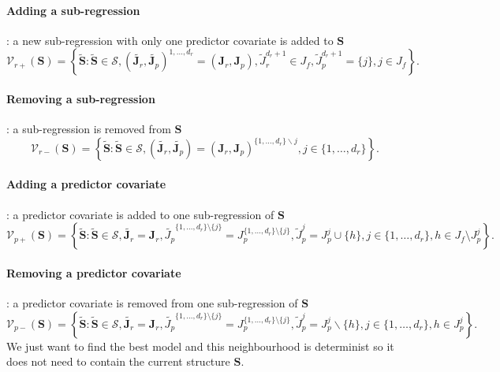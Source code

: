 \documentclass[12pt,a4paper]{report}
\begin{document}
	\paragraph{Adding a sub-regression}: a new sub-regression with only one predictor covariate is added to $\boldsymbol{S}$
\begin{equation}
\mathcal{V}_{r+}(\boldsymbol{S}) = \left\{\tilde{\boldsymbol{S}}: \tilde{\boldsymbol{S}}\in\mathcal{S}, (\tilde{\boldsymbol{J}_r},\tilde{\boldsymbol{J}_p})^{1,\ldots,d_r}=(\boldsymbol{J}_r,\boldsymbol{J}_p), \tilde{J}_r^{d_r+1}\in J_f, \tilde{J}_p^{d_r+1}=\{j\}, j\in J_f \right\}.
\end{equation}	
		\paragraph{Removing a sub-regression}: a sub-regression  is removed from $\boldsymbol{S}$
\begin{equation}
\mathcal{V}_{r-}(\boldsymbol{S}) = \left\{\tilde{\boldsymbol{S}}: \tilde{\boldsymbol{S}}\in\mathcal{S}, (\tilde{\boldsymbol{J}_r},\tilde{\boldsymbol{J}_p})=(\boldsymbol{J}_r,\boldsymbol{J}_p)^{\{1,\ldots,d_r\}\backslash j}, j\in\{1,\ldots,d_r\} \right\}.
\end{equation}	
	\paragraph{Adding a predictor covariate}: a predictor covariate is added to one sub-regression of $\boldsymbol{S}$
\begin{equation}
\mathcal{V}_{p+}(\boldsymbol{S}) = \left\{\tilde{\boldsymbol{S}}: \tilde{\boldsymbol{S}}\in\mathcal{S}, \tilde{\boldsymbol{J}_r}=\boldsymbol{J}_r, \tilde{J_p}^{\{1,\dots,d_r \}\setminus \{j\}}=J_p^{\{1,\dots,d_r \}\setminus \{j\}} ,\tilde{J}_p^{j}=J_p^{j} \cup \{h\}, j\in \{1,\ldots,d_r\}, h\in J_f \setminus J_p^j\right\}.
\end{equation}
	\paragraph{Removing a predictor covariate}: a predictor covariate is removed from one sub-regression of $\boldsymbol{S}$
\begin{equation}
\mathcal{V}_{p-}(\boldsymbol{S}) = \left\{\tilde{\boldsymbol{S}}: \tilde{\boldsymbol{S}}\in\mathcal{S}, \tilde{\boldsymbol{J}_r}=\boldsymbol{J}_r,\tilde{J_p}^{\{1,\dots,d_r \}\setminus \{j\}}=J_p^{\{1,\dots,d_r \}\setminus \{j\}} , \tilde{J}_p^{j}=J_p^{j} \backslash \{h\}, j\in \{1,\ldots,d_r\}, h\in  J_p^j \right\}.
\end{equation}	
	We just want to find the best model and this neighbourhood is determinist so it does not need to contain the current structure $\boldsymbol{S}$.
	
\end{document}
